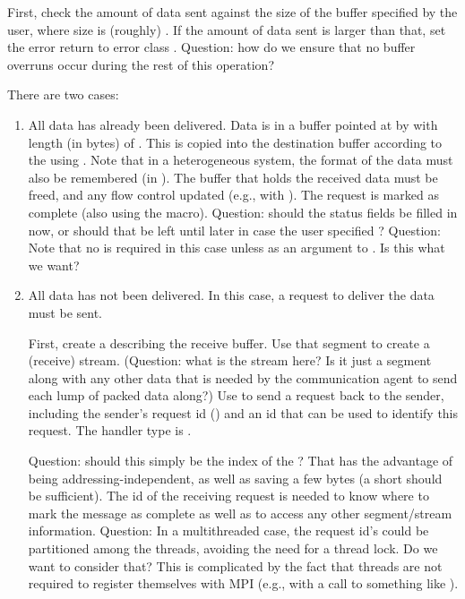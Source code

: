 \begin{mmadi}
\begin{tcp}
\begin{enumerate}
First, check the amount of data sent against the size of the buffer specified
by the user, where size is (roughly) .  If the
amount of data sent is larger than that, set the error return to error class
.   
Question: how do we ensure that no buffer overruns occur during the rest of
this operation?

There are two cases:
\begin{enumerate}
\item All data has already been delivered.  
Data is in a buffer pointed at by  with length
(in bytes) of .  This is copied into the
destination buffer according to the  using
.  Note that in a heterogeneous system, the format of the
data must also be remembered (in ).
The buffer that holds the received data must be freed, and any flow control
updated (e.g., with ).  The request is marked as
complete (also using the  macro).
Question: should the status fields be filled in now, or should that be left
until later in case the user specified ?
Question:  Note that no  is required in this case
unless as an argument to .  Is this what we want?

\item All data has not been delivered.  In this case, a request to deliver the
  data must be sent.  
  
  First, create a  describing the receive buffer.
  Use that segment to create a (receive) stream.
  (Question: what is the stream here?  Is it just a segment along with any
  other data that is needed by the communication agent to send each lump of
  packed data along?) 
  Use  to send a request back to the
  sender, including the sender's request id
  () and an id that can be used to
  identify this request.  The handler type is .

  Question: should this simply be the index of the ?
  That has the advantage of being addressing-independent, as well as saving a
  few bytes (a short should be sufficient).  The id of the receiving request
  is needed to know where to mark the message as complete as well as to access
  any other segment/stream information.
  Question: In a multithreaded case, the request id's could be partitioned
  among the threads, avoiding the need for a thread lock.  Do we want to
  consider that?  This is complicated by the fact that threads are not
  required to register themselves with MPI (e.g., with a call to something
  like ).


\end{enumerate}
\end{enumerate}
\end{tcp}
\end{mmadi}
